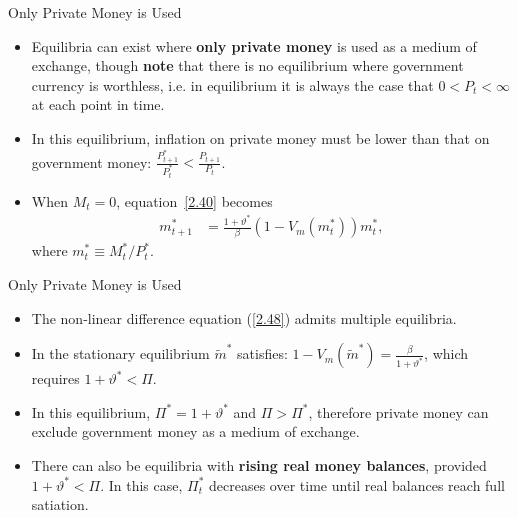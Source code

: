 \documentclass[11pt,aspectratio=169]{beamer}
\begin{document}
\begin{frame}{Only Private Money is Used}
\begin{itemize}
    \item Equilibria can exist where \textbf{only private money} is used as a medium of exchange, though \textbf{note}  that there is no equilibrium where government currency is worthless, i.e. in equilibrium it is always the case that $0<P_t<\infty$ at each point in time.
\vspace{0.3em}  
\item In this equilibrium, inflation on private money must be lower than that on government money: $  \frac{P_{t+1}^*}{P_t^*} < \frac{P_{t+1}}{P_t}$.
\vspace{0.3em}  
\item When $M_t = 0$, equation~\eqref{2.40} becomes
    \begin{align}
    m_{t+1}^* &= \frac{1 + \vartheta^*}{\beta} (1 - V_m(m_t^*)) m_t^*,
    \label{2.48}
    \end{align}
    where $m_t^* \equiv M_t^*/P_t^*$.
\end{itemize}
\end{frame}


\begin{frame}{Only Private Money is Used}
\begin{itemize}
\item The non-linear difference equation (\ref{2.48}) admits multiple equilibria.
\vspace{0.2em}
    \item In the stationary equilibrium $\tilde{m}^*$ satisfies: $1 - V_m(\tilde{m}^*) = \frac{\beta}{1 + \vartheta^*}$,
    which requires $1 + \vartheta^* < \Pi$.

    \vspace{0.2em}
    \item In this equilibrium, $\Pi^* = 1 + \vartheta^*$ and $\Pi > \Pi^*$, therefore private money can exclude government money as a medium of exchange.
    \vspace{0.2em}
    \item There can also be equilibria with \textbf{rising real money balances}, provided $1 + \vartheta^* < \Pi$.  
    In this case, $\Pi_t^*$ decreases over time until real balances reach full satiation.
    \end{itemize}
\end{frame}
\end{document}
